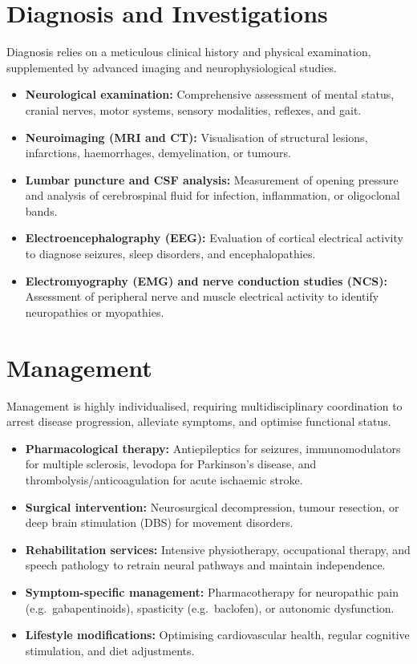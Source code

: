 \section*{Diagnosis and Investigations}
Diagnosis relies on a meticulous clinical history and physical examination, supplemented by advanced imaging and neurophysiological studies.
\begin{itemize}
    \item \textbf{Neurological examination:} Comprehensive assessment of mental status, cranial nerves, motor systems, sensory modalities, reflexes, and gait.
    \item \textbf{Neuroimaging (MRI and CT):} Visualisation of structural lesions, infarctions, haemorrhages, demyelination, or tumours.
    \item \textbf{Lumbar puncture and CSF analysis:} Measurement of opening pressure and analysis of cerebrospinal fluid for infection, inflammation, or oligoclonal bands.
    \item \textbf{Electroencephalography (EEG):} Evaluation of cortical electrical activity to diagnose seizures, sleep disorders, and encephalopathies.
    \item \textbf{Electromyography (EMG) and nerve conduction studies (NCS):} Assessment of peripheral nerve and muscle electrical activity to identify neuropathies or myopathies.
\end{itemize}

\section*{Management}
Management is highly individualised, requiring multidisciplinary coordination to arrest disease progression, alleviate symptoms, and optimise functional status.
\begin{itemize}
    \item \textbf{Pharmacological therapy:} Antiepileptics for seizures, immunomodulators for multiple sclerosis, levodopa for Parkinson's disease, and thrombolysis/anticoagulation for acute ischaemic stroke.
    \item \textbf{Surgical intervention:} Neurosurgical decompression, tumour resection, or deep brain stimulation (DBS) for movement disorders.
    \item \textbf{Rehabilitation services:} Intensive physiotherapy, occupational therapy, and speech pathology to retrain neural pathways and maintain independence.
    \item \textbf{Symptom-specific management:} Pharmacotherapy for neuropathic pain (e.g.\ gabapentinoids), spasticity (e.g.\ baclofen), or autonomic dysfunction.
    \item \textbf{Lifestyle modifications:} Optimising cardiovascular health, regular cognitive stimulation, and diet adjustments.
\end{itemize}

